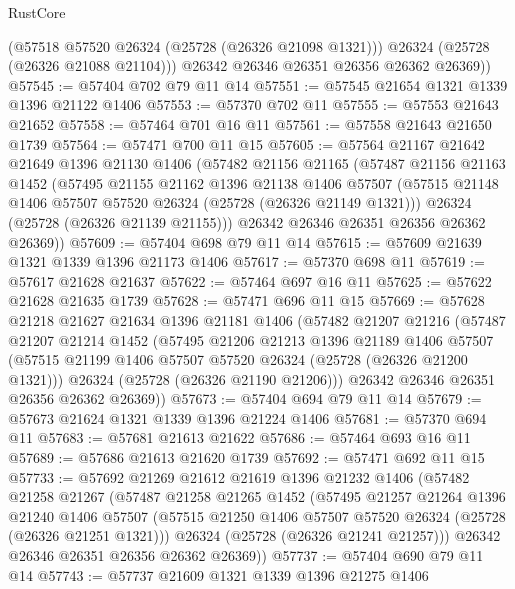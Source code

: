 \begin{lexlean}{RustCore}
\begin{coremodule}
          (@57518 @57520 @26324 (@25728 (@26326 @21098 @1321)))
          @26324
          (@25728 (@26326 @21088 @21104)))
        @26342
        @26346
        @26351
        @26356
        @26362
        @26369))
@57545 := @57404 @702 @79 @11 @14
@57551 := @57545 @21654 @1321 @1339 @1396 @21122 @1406
@57553 := @57370 @702 @11
@57555 := @57553 @21643 @21652
@57558 := @57464 @701 @16 @11
@57561 := @57558 @21643 @21650 @1739
@57564 := @57471 @700 @11 @15
@57605 := @57564
    @21167
    @21642
    @21649
    @1396
    @21130
    @1406
    (@57482
      @21156
      @21165
      (@57487
        @21156
        @21163
        @1452
        (@57495
          @21155
          @21162
          @1396
          @21138
          @1406
          @57507
          (@57515 @21148 @1406 @57507 @57520 @26324 (@25728 (@26326 @21149 @1321)))
          @26324
          (@25728 (@26326 @21139 @21155)))
        @26342
        @26346
        @26351
        @26356
        @26362
        @26369))
@57609 := @57404 @698 @79 @11 @14
@57615 := @57609 @21639 @1321 @1339 @1396 @21173 @1406
@57617 := @57370 @698 @11
@57619 := @57617 @21628 @21637
@57622 := @57464 @697 @16 @11
@57625 := @57622 @21628 @21635 @1739
@57628 := @57471 @696 @11 @15
@57669 := @57628
    @21218
    @21627
    @21634
    @1396
    @21181
    @1406
    (@57482
      @21207
      @21216
      (@57487
        @21207
        @21214
        @1452
        (@57495
          @21206
          @21213
          @1396
          @21189
          @1406
          @57507
          (@57515 @21199 @1406 @57507 @57520 @26324 (@25728 (@26326 @21200 @1321)))
          @26324
          (@25728 (@26326 @21190 @21206)))
        @26342
        @26346
        @26351
        @26356
        @26362
        @26369))
@57673 := @57404 @694 @79 @11 @14
@57679 := @57673 @21624 @1321 @1339 @1396 @21224 @1406
@57681 := @57370 @694 @11
@57683 := @57681 @21613 @21622
@57686 := @57464 @693 @16 @11
@57689 := @57686 @21613 @21620 @1739
@57692 := @57471 @692 @11 @15
@57733 := @57692
    @21269
    @21612
    @21619
    @1396
    @21232
    @1406
    (@57482
      @21258
      @21267
      (@57487
        @21258
        @21265
        @1452
        (@57495
          @21257
          @21264
          @1396
          @21240
          @1406
          @57507
          (@57515 @21250 @1406 @57507 @57520 @26324 (@25728 (@26326 @21251 @1321)))
          @26324
          (@25728 (@26326 @21241 @21257)))
        @26342
        @26346
        @26351
        @26356
        @26362
        @26369))
@57737 := @57404 @690 @79 @11 @14
@57743 := @57737 @21609 @1321 @1339 @1396 @21275 @1406

\end{coremodule}
\end{lexlean}
